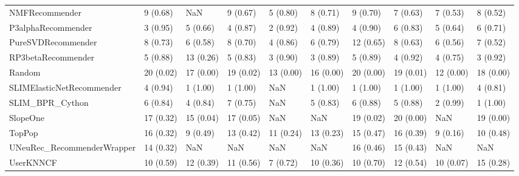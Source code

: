 \begin{tabular}{llllllllll}
                     NMFRecommender &                 9 (0.68) &         NaN &      9 (0.67) &     5 (0.80) &             8 (0.71) &            9 (0.70) &          7 (0.63) &           7 (0.53) &          8 (0.52) \\
                 P3alphaRecommender &                 3 (0.95) &    5 (0.66) &      4 (0.87) &     2 (0.92) &             4 (0.89) &            4 (0.90) &          6 (0.83) &           5 (0.64) &          6 (0.71) \\
                 PureSVDRecommender &                 8 (0.73) &    6 (0.58) &      8 (0.70) &     4 (0.86) &             6 (0.79) &           12 (0.65) &          8 (0.63) &           6 (0.56) &          7 (0.52) \\
                 RP3betaRecommender &                 5 (0.88) &   13 (0.26) &      5 (0.83) &     3 (0.90) &             3 (0.89) &            5 (0.89) &          4 (0.92) &           4 (0.75) &          3 (0.92) \\
                             Random &                20 (0.02) &   17 (0.00) &     19 (0.02) &    13 (0.00) &            16 (0.00) &           20 (0.00) &         19 (0.01) &          12 (0.00) &         18 (0.00) \\
          SLIMElasticNetRecommender &                 4 (0.94) &    1 (1.00) &      1 (1.00) &          NaN &             1 (1.00) &            1 (1.00) &          1 (1.00) &           1 (1.00) &          4 (0.81) \\
                    SLIM\_BPR\_Cython &                 6 (0.84) &    4 (0.84) &      7 (0.75) &          NaN &             5 (0.83) &            6 (0.88) &          5 (0.88) &           2 (0.99) &          1 (1.00) \\
                           SlopeOne &                17 (0.32) &   15 (0.04) &     17 (0.05) &          NaN &                  NaN &           19 (0.02) &         20 (0.00) &                NaN &         19 (0.00) \\
                             TopPop &                16 (0.32) &    9 (0.49) &     13 (0.42) &    11 (0.24) &            13 (0.23) &           15 (0.47) &         16 (0.39) &           9 (0.16) &         10 (0.48) \\
         UNeuRec\_RecommenderWrapper &                14 (0.32) &         NaN &           NaN &          NaN &                  NaN &           16 (0.46) &         15 (0.43) &                NaN &               NaN \\
                          UserKNNCF &                10 (0.59) &   12 (0.39) &     11 (0.56) &     7 (0.72) &            10 (0.36) &           10 (0.70) &         12 (0.54) &          10 (0.07) &         15 (0.28) \\
\bottomrule
\end{tabular}
